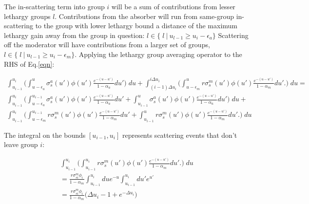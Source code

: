 \documentclass{article}
\begin{document}
          The in-scattering term into group $i$ will be a sum of contributions from lesser lethargy groups $l$.
          Contributions from the absorber will run from same-group in-scattering to the group
          with lower lethargy bound a distance of the maximum lethargy gain away from the group in 
          question: 
          $l \in \{ \; l \: | \: u_{l-1} \geq u_i - \epsilon_a  \} $
          Scattering off the moderator will have contributions from a larger set of groups, 
          $l \in \{ \; l \: | \ u_{l-1} \geq u_i - \epsilon_m  \} $. 
          Applying the lethargy group averaging operator to the RHS of Eq.\:\ref{eqn}:
          

         \begin{align}            
             \int_{u_{i-1}}^{u_{i}} 
            \bigg(  
            \int_{u - \epsilon_a}^{u} \sigma_s^a(u')\phi(u') \frac{e^{-(u-u')}}{1 - \alpha_a}du'  
            \bigg)  \; du + 
            \int_{(i-1)\Delta u_i}^{i \Delta u_i} 
            \bigg(  
            \int_{u - \epsilon_m}^{u} r \sigma_s^m(u')\phi(u') \frac{e^{-(u-u')}}{1 - \alpha_m}du'.
        \bigg)  \; du  = \\
             \int_{u_{i-1}}^{u_{i}} 
            \bigg(  
                \int_{u - \epsilon_a}^{u_{i-1}} \sigma_s^a(u')\phi(u') \frac{e^{-(u-u')}}{1 - \alpha_a}du'  +
                \int_{u_{i-1}}^{u} \sigma_s^a(u')\phi(u') \frac{e^{-(u-u')}}{1 - \alpha_a}du'  
            \bigg)  \; du + \\
             \int_{u_{i-1}}^{u_{i}} 
            \bigg(  
                \int_{u - \epsilon_m}^{u_{i-1}} r \sigma_s^m(u')\phi(u') \frac{e^{-(u-u')}}{1 - \alpha_m}du' +
                \int_{u_{i-1}}^{u} r \sigma_s^m(u')\phi(u') \frac{e^{-(u-u')}}{1 - \alpha_m}du'.
            \bigg)  \; du  
         \end{align}
         
         The integral on the bounds $[u_{i-1}, u_i]$ represents scattering events 
         that don't leave group $i$:

         \begin{align}
             \int_{u_{i-1}}^{u_{i}} 
            \bigg(  
                \int_{u_{i-1}}^{u_{i}} r \sigma_s^m(u')\phi(u') \frac{e^{-(u-u')}}{1 - \alpha_m}du'.
            \bigg)  \; du  \\ =   
            \frac{r \sigma_{si}^m \phi_i}{1-\alpha_m} 
            \int_{u_{i-1}}^{u_{i}} du e^{-u} \int_{u_{i-1}}^{u_{i}} du' e^{u'} \\ =
            \frac{r \sigma_{si}^m \phi_i}{1-\alpha_m} \big( \Delta u_i -1 + e^{-\Delta u_i} \big)
         \end{align}
\end{document}
